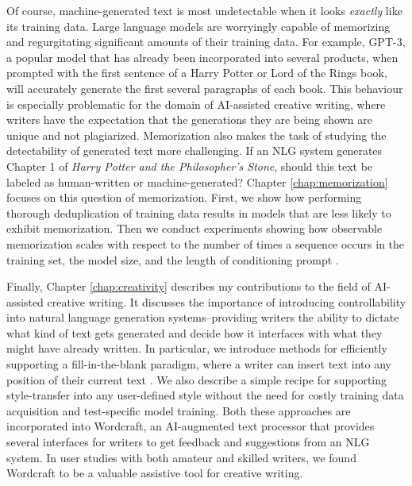 Of course, machine-generated text is most undetectable when it looks \textit{exactly} like its training data.
Large language models are worryingly capable of memorizing and regurgitating significant amounts of their training data.
For example, GPT-3, a popular model that has already been incorporated into several products, when prompted with the first sentence of a Harry Potter or Lord of the Rings book, will accurately generate the first several paragraphs of each book.
This behaviour is especially problematic for the domain of AI-assisted creative writing, where writers have the expectation that the generations they are being shown are unique and not plagiarized.
Memorization also makes the task of studying the detectability of generated text more challenging.
If an NLG system generates Chapter 1 of \textit{Harry Potter and the Philosopher's Stone}, should this text be labeled as human-written or machine-generated?
Chapter \ref{chap:memorization} focuses on this question of memorization.
First, we show how performing thorough deduplication of training data results in models that are less likely to exhibit memorization.
Then we conduct experiments showing how observable memorization scales with respect to the number of times a sequence occurs in the training set, the model size, and the length of conditioning prompt \citep{carlini2022quantifying}.

Finally, Chapter \ref{chap:creativity} describes my contributions to the field of AI-assisted creative writing. 
It discusses the importance of introducing controllability into natural language generation systems--providing writers the ability to dictate what kind of text gets generated and decide how it interfaces with what they might have already written.
In particular, we introduce methods for efficiently supporting a fill-in-the-blank paradigm, where a writer can insert text into any position of their current text \citep{fitb_fite}.
We also describe a simple recipe for supporting style-transfer into any user-defined style without the need for costly training data acquisition and test-specific model training.
Both these approaches are incorporated into Wordcraft, an AI-augmented text processor that provides several interfaces for writers to get feedback and suggestions from an NLG system.
In user studies with both amateur and skilled writers, we found Wordcraft to be a valuable assistive tool for creative writing.





